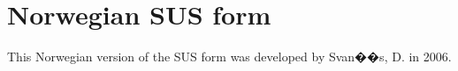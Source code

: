 \chapter{Norwegian SUS form}
\label{norsksus}

This Norwegian version of the SUS form was developed by Svan��s, D. in 2006.

